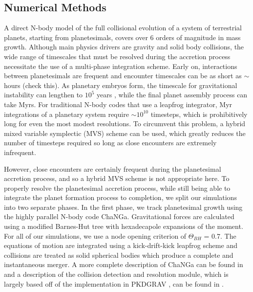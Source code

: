 \subsection{Numerical Methods} \label{sec:numerical}

A direct N-body model of the full collisional evolution of a system of terrestrial planets, starting from planetesimals, covers over 
6 orders of magnitude in mass growth. Although main physics drivers are gravity and solid body collisions, the wide range of 
timescales that must be resolved during the accretion process necessitate the use of a multi-phase integration scheme. Early 
on, interactions between planetesimals are frequent and encounter timescales can be as short as $\sim$ hours (check this). 
As planetary embryos form, the timescale for gravitational instability can lengthen to $10^{5}$ years \cite{chambers96}, while 
the final planet assembly process can take Myrs. For traditional N-body codes that use a leapfrog integrator, Myr integrations 
of a planetary system require $\sim 10^{10}$ timesteps, which is prohibitively long for even the most modest resolutions. To 
circumvent this problem, a hybrid mixed variable symplectic (MVS) scheme \cite{chambers99} can be used, which greatly 
reduces the number of timesteps required so long as close encounters are extremely infrequent.

However, close encounters are certainly frequent during the planetesimal accretion process, and so a hybrid MVS scheme is 
not appropriate here. To properly resolve the planetesimal accretion process, while still being able to integrate the planet 
formation process to completion, we split our simulations into two separate phases. In the first phase, we track planetesimal 
growth using the highly parallel N-body code {\sc ChaNGa}. Gravitational forces are calculated using a modified Barnes-Hut 
\cite{barnes86} tree with hexadecapole expansions of the moment. For all of our simulations, we use a node opening criterion 
of $\Theta_{BH}$ = 0.7. The equations of motion are integrated using a kick-drift-kick leapfrog scheme and collisions are 
treated as solid spherical bodies which produce a complete and instantaneous merger. A more complete description of  
{\sc ChaNGa} can be found in \cite{jetley08, menon15} and a description of the collision detection and resolution module, 
which is largely based off of the implementation in PKDGRAV \cite{richardson94, richardson00}, can be found in 
\cite{wallace19}.

